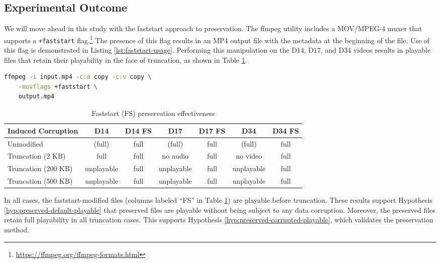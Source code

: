 \subsection{Experimental Outcome}

We will move ahead in this study with the faststart approach to preservation. The ffmpeg utility includes a MOV/MPEG-4 muxer that supports a \texttt{+faststart} flag.\footnote{\url{https://ffmpeg.org/ffmpeg-formats.html}} The presence of this flag results in an MP4 output file with the metadata at the beginning of the file. Use of this flag is demonstrated in Listing \ref{lst:faststart-usage}. Performing this manipulation on the D14, D17, and D34 videos results in playable files that retain their playability in the face of truncation, as shown in Table \ref{tab:faststart-preservation}.

\vspace{1em}
\begin{lstlisting}[language=bash,caption={ffmpeg faststart usage example},label={lst:faststart-usage}]
ffmpeg -i input.mp4 -c:a copy -c:v copy \
    -movflags +faststart \
    output.mp4
\end{lstlisting}

\begin{table}
    \centering
    \begin{tabular}{|l||cc|cc|cc|}
        \hline
        \textbf{Induced Corruption} & \textbf{D14} & \textbf{D14 FS} & \textbf{D17} & \textbf{D17 FS} & \textbf{D34} & \textbf{D34 FS} \\
        \hline \hline
        Unmodified & (full) & full & (full) & full & (full) & full \\
        \hline \hline
        Truncation (2 KB) & full & full & no audio & full & no video & full \\
        Truncation (200 KB) & unplayable & full & unplayable & full & unplayable & full \\
        Truncation (500 KB) & unplayable & full & unplayable & full & unplayable & full \\
        \hline
    \end{tabular}
    \caption{Faststart (FS) preservation effectiveness}
    \label{tab:faststart-preservation}
\end{table}

In all cases, the faststart-modified files (columns labeled ``FS'' in Table \ref{tab:faststart-preservation}) are playable before truncation. These results support Hypothesis \ref{hyp:preserved-default-playable} that preserved files are playable without being subject to any data corruption. Moreover, the preserved files retain full playability in all truncation cases. This supports Hypothesis \ref{hyp:preserved-corrupted-playable}, which validates the preservation method.


